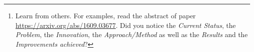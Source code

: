 

\chapterend

\begin{titlepage}

\begin{otherlanguage}{english} 
\begin{abstract} %

Write your abstract here. (Note: the abstract should contain the whole work\footnote{Learn from others. For examples, read the abstract of paper \url{https://arxiv.org/abs/1609.03677}. Did you notice the \emph{Current Status}, the \emph{Problem}, the \emph{Innovation}, the \emph{Approach/Method} as well as the \emph{Results} and the \emph{Improvements achieved}? }  -- especially the results).

\end{abstract}
\end{otherlanguage}


\end{titlepage}




